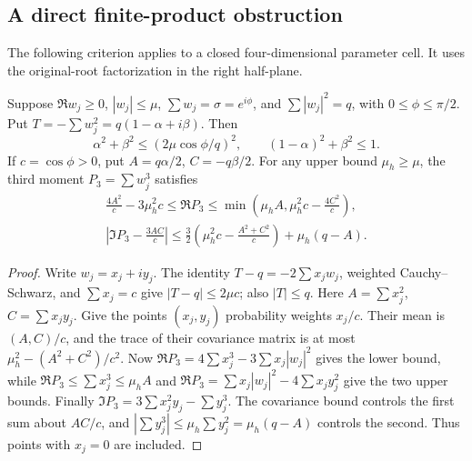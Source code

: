 \subsection{A direct finite-product obstruction}

The following criterion applies to a closed four-dimensional parameter
cell. It uses the original-root factorization in the right half-plane.

\begin{lemma}\label{mf:cubic-moment}
Suppose $\Re w_j\ge0$, $|w_j|\le\mu$, $\sum w_j=\sigma=e^{i\phi}$,
and $\sum|w_j|^2=q$, with $0\le\phi\le\pi/2$.
Put $T=-\sum w_j^2=q(1-\alpha+i\beta)$.
Then
\[
 \alpha^2+\beta^2\le(2\mu\cos\phi/q)^2,\qquad
 (1-\alpha)^2+\beta^2\le1.
\]
If $c=\cos\phi>0$, put $A=q\alpha/2$, $C=-q\beta/2$.
For any upper bound $\mu_h\ge\mu$, the third moment
$P_3=\sum w_j^3$ satisfies
\begin{gather}
 \frac{4A^2}{c}-3\mu_h^2c\le\Re P_3
 \le\min\left(\mu_hA,\mu_h^2c-\frac{4C^2}{c}\right),
 \label{mf:cubic-real}\\
 \left|\Im P_3-\frac{3AC}{c}\right|
 \le\frac32\left(\mu_h^2c-\frac{A^2+C^2}{c}\right)
                         +\mu_h(q-A).
 \label{mf:cubic-imag}
\end{gather}
\end{lemma}
\begin{proof}
Write $w_j=x_j+iy_j$. The identity
$T-q=-2\sum x_jw_j$, weighted Cauchy--Schwarz, and
$\sum x_j=c$ give $|T-q|\le2\mu c$; also $|T|\le q$.
Here $A=\sum x_j^2$, $C=\sum x_jy_j$.
Give the points $(x_j,y_j)$ probability weights $x_j/c$.
Their mean is $(A,C)/c$, and the trace of their covariance
matrix is at most $\mu_h^2-(A^2+C^2)/c^2$.
Now
$\Re P_3=4\sum x_j^3-3\sum x_j|w_j|^2$
gives the lower bound, while
$\Re P_3\le\sum x_j^3\le\mu_h A$ and
$\Re P_3=\sum x_j|w_j|^2-4\sum x_jy_j^2$
give the two upper bounds.
Finally $\Im P_3=3\sum x_j^2y_j-\sum y_j^3$.
The covariance bound controls the first sum about $AC/c$,
and $|\sum y_j^3|\le\mu_h\sum y_j^2=\mu_h(q-A)$
controls the second. Thus points with $x_j=0$ are included.
\end{proof}

